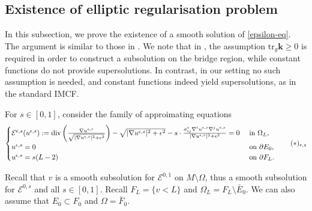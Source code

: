 \documentclass[11pt, letterpaper]{amsart}
\theoremstyle{definition}
\theoremstyle{remark}
\begin{document}
\begin{appendix}
\subsection{Existence of elliptic regularisation problem}\label{appen-elliptic-reg}
In this subsection, we prove the existence of a smooth solution of \ref{epsilon-eq}. The argument is similar to those in \cite{HI01, Moore12}. We note that in \cite{Moore12}, the assumption $\mathrm{tr}_g \mathbf{k} \geq 0$ is required in order to construct a subsolution on the bridge region, while constant functions do not provide supersolutions. In contrast, in our setting no such assumption is needed, and constant functions indeed yield supersolutions, as in the standard IMCF. 

For $s \in [0,1]$, consider the family of approimating equations
\begin{align}\label{epsilon-s-eq}
	\begin{cases}
		\mathcal{E}^{\epsilon , s}(u ^{\epsilon ,s} ):= \mathrm{div}\left( \frac{\nabla u ^{\epsilon , s}}{ \sqrt{|\nabla u^{\epsilon, s }|^2 + \epsilon ^2} } \right) - \sqrt{|\nabla u^{\epsilon, s }|^2+ \epsilon ^2} - s\cdot \frac{\sigma^{\epsilon } _{ij}\nabla ^{i} u^{\epsilon, s } \nabla ^{j} u ^{\epsilon ,s}}{|\nabla u^{\epsilon,s }|^2 + \epsilon ^2} =0 &\text{ in } \Omega _{L},\\
		u ^{\epsilon , s}=0 &\text{ on } \partial E_0,\\
		u ^{\epsilon , s}= s(L-2) & \text{ on } \partial F_{L}.
	\end{cases}
	\tag*{$(*)_{\epsilon ,s}$}
\end{align}

Recall that $v$ is a smooth subsolution for $\mathcal{E}^{0, 1}$ on $M \setminus \Omega $, thus a smooth subsolution for $\mathcal{E}^{0, s}$ and all $s \in [0,1]$. Recall $F_L = \{v<L\} $ and $\Omega _{L} = F_L \setminus \bar{E}_0$. We can also assume that $E_0 \subset F_0  $ and $\Omega = \bar{F}_0$.






\end{appendix}
\end{document}
